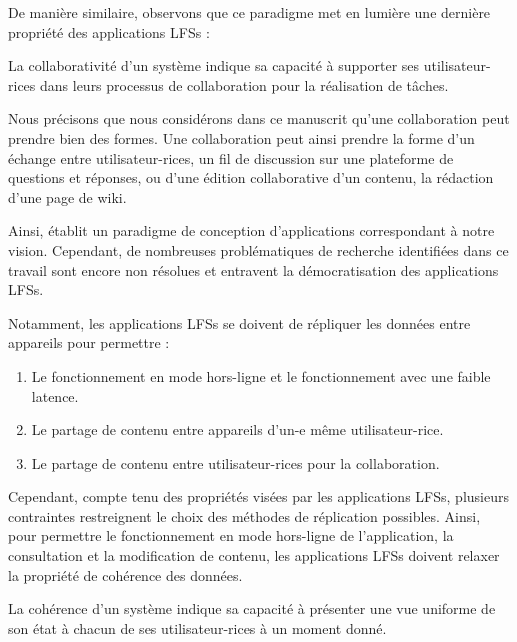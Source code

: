 De manière similaire, observons que ce paradigme met en lumière une dernière propriété des applications \acp{LFS} :
\begin{definition}[Collaborativité]
  \label{def:collaborative}
  La collaborativité d'un système indique sa capacité à supporter ses utilisateur-rices dans leurs processus de collaboration pour la réalisation de tâches.
\end{definition}
Nous précisons que nous considérons dans ce manuscrit qu'une collaboration peut prendre bien des formes.
Une collaboration peut ainsi prendre la forme d'un échange entre utilisateur-rices, \eg un fil de discussion sur une plateforme de questions et réponses, ou d'une édition collaborative d'un contenu, \eg la rédaction d'une page de wiki.


Ainsi, \cite{localfirstsoftware2019} établit un paradigme de conception d'applications correspondant à notre vision.
Cependant, de nombreuses problématiques de recherche identifiées dans ce travail sont encore non résolues et entravent la démocratisation des applications \acp{LFS}.

Notamment, les applications \acp{LFS} se doivent de répliquer les données entre appareils pour permettre :
\begin{enumerate}
  \item Le fonctionnement en mode hors-ligne et le fonctionnement avec une faible latence.
  \item Le partage de contenu entre appareils d'un-e même utilisateur-rice.
  \item Le partage de contenu entre utilisateur-rices pour la collaboration.
\end{enumerate}

Cependant, compte tenu des propriétés visées par les applications \acp{LFS}, plusieurs contraintes restreignent le choix des méthodes de réplication possibles.
Ainsi, pour permettre le fonctionnement en mode hors-ligne de l'application, \ie la consultation et la modification de contenu, les applications \acp{LFS} doivent relaxer la propriété de cohérence des données.
\begin{definition}[Cohérence]
  La cohérence d'un système indique sa capacité à présenter une vue uniforme de son état à chacun de ses utilisateur-rices à un moment donné.
\end{definition}

